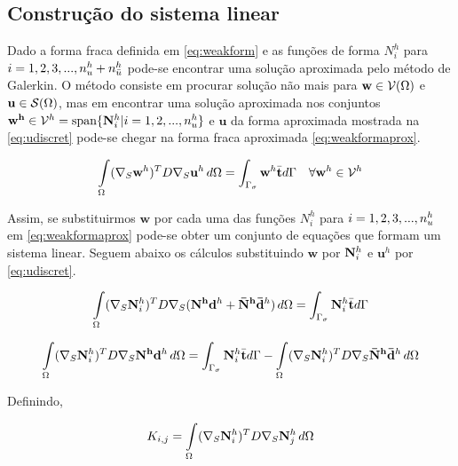 \subsection{Construção do sistema linear}

Dado a forma fraca definida em \eqref{eq:weakform} e as funções de forma $N_i^h$ para $i = 1, 2, 3, ..., \freedomfine + \essentialfine$ pode-se encontrar uma solução aproximada pelo método de Galerkin. O método consiste em procurar solução não mais para $\mathbf{w} \in \trial$ e $\mathbf{u} \in \test$, mas em encontrar uma solução aproximada nos conjuntos  $\mathbf{w^h} \in \trialaprox = \text{span}\{ \basefunctionfine | i = 1,2, ..., \freedomfine  \}$ e $\mathbf{u}$ da forma aproximada mostrada na \eqref{eq:udiscret} pode-se chegar na forma fraca aproximada \eqref{eq:weakformaprox}.


\begin{equation}\label{eq:weakformaprox}
\omeint{ (\sopnabla \mathbf{w}^h)^T D \sopnabla  \mathbf{u}^h}  =  \int_{\Gamma_\sigma} \mathbf{w}^h \bar{\mathbf{t}} d\Gamma \quad \forall \mathbf{w}^h \in \trialaprox
\end{equation}


Assim, se substituirmos $\mathbf{w}$ por cada uma das funções $N_i^h$ para $i = 1, 2, 3, ..., \freedomfine$ em \eqref{eq:weakformaprox} pode-se obter um conjunto de equações que formam um sistema linear. Seguem abaixo os cálculos substituindo $\mathbf{w}$ por $\basefunctionfine$ e $\mathbf{u}^h$ por \eqref{eq:udiscret}.


\begin{equation}
\omeint{ (\sopnabla \basefunctionfine)^T D \sopnabla (\mathbf{N^h} \mathbf{d}^h + \mathbf{\bar{N}^h} \mathbf{\bar{d}}^h )} = \int_{\Gamma_\sigma} \basefunctionfine \bar{\mathbf{t}} d\Gamma 
\end{equation}

\begin{equation}\label{eq:umaequacaosistema}
\omeint{ (\sopnabla \basefunctionfine)^T D \sopnabla \mathbf{N^h} \mathbf{d}^h }  = \int_{\Gamma_\sigma} \basefunctionfine \bar{\mathbf{t}}  d\Gamma - \omeint{ (\sopnabla \basefunctionfine)^T D \sopnabla  \mathbf{\bar{N}^h} \mathbf{\bar{d}}^h} 
\end{equation}

Definindo, 

\begin{equation}\label{eq:entradamatriz}
    K_{i,j} = \omeint{(\sopnabla \basefunctionfine)^T D \sopnabla \basefunctionfine[j]}
\end{equation}


